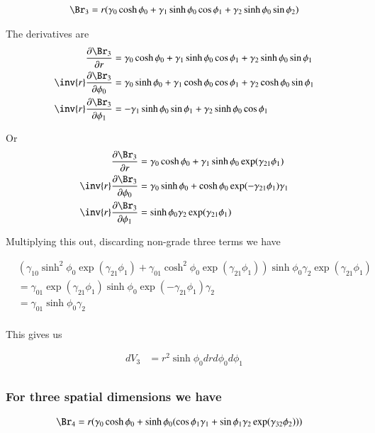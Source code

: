 \begin{align*}
\Br_3 &= r (\gamma_0 \cosh \phi_0 + \gamma_1 \sinh\phi_0 \cos\phi_1 + \gamma_2 \sinh\phi_0 \sin\phi_2 ) \\
\end{align*}

The derivatives are
\begin{align*}
\PD{r}{\Br_3} &= \gamma_0 \cosh \phi_0 + \gamma_1 \sinh\phi_0 \cos\phi_1 + \gamma_2 \sinh\phi_0 \sin\phi_1  \\
\inv{r} \PD{\phi_0}{\Br_3} &= \gamma_0 \sinh \phi_0 + \gamma_1 \cosh\phi_0 \cos\phi_1 + \gamma_2 \cosh\phi_0 \sin\phi_1  \\
\inv{r} \PD{\phi_1}{\Br_3} &= -\gamma_1 \sinh\phi_0 \sin\phi_1 + \gamma_2 \sinh\phi_0 \cos\phi_1 
\end{align*}

Or
\begin{align*}
\PD{r}{\Br_3} &= \gamma_0 \cosh \phi_0 + \gamma_1 \sinh\phi_0 \exp (\gamma_{21} \phi_1 ) \\
\inv{r} \PD{\phi_0}{\Br_3} &= \gamma_0 \sinh \phi_0 + \cosh\phi_0 \exp (-\gamma_{21} \phi_1 ) \gamma_1 \\
\inv{r} \PD{\phi_1}{\Br_3} &= \sinh\phi_0 \gamma_2 \exp(\gamma_{21} \phi_1 )
\end{align*}

Multiplying this out, discarding non-grade three terms we have

\begin{align*}
&(\gamma_{10} \sinh^2\phi_0 \exp (\gamma_{21} \phi_1 ) +\gamma_{01} \cosh^2 \phi_0 \exp (\gamma_{21} \phi_1 ) ) \sinh\phi_0 \gamma_2 \exp(\gamma_{21} \phi_1 ) \\
&=\gamma_{01} \exp (\gamma_{21} \phi_1 ) \sinh\phi_0 \exp(-\gamma_{21} \phi_1 ) \gamma_2 \\
&=\gamma_{01} \sinh\phi_0 \gamma_2 \\
\end{align*}

This gives us

\begin{align*}
dV_3 &= r^2 \sinh\phi_0 dr d\phi_0 d\phi_1 \\
\end{align*}

\subsubsection{For three spatial dimensions we have }

\begin{align*}
\Br_4 &= r (\gamma_0 \cosh \phi_0 + \sinh\phi_0 ( \cos\phi_1 \gamma_1 + \sin\phi_1 \gamma_2 \exp( \gamma_{32} \phi_2 )) )
\end{align*}

